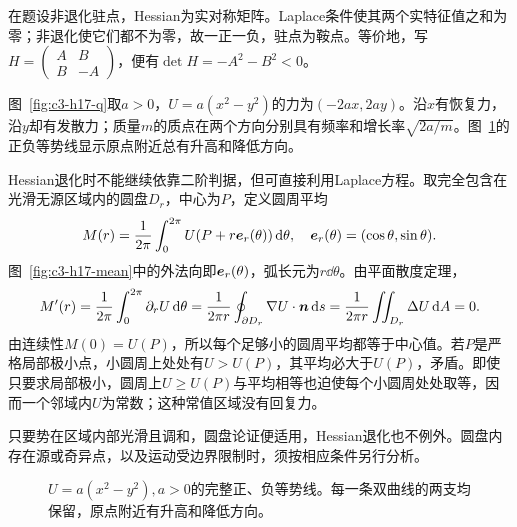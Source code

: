 \begin{solution}
在题设非退化驻点，Hessian为实对称矩阵。Laplace条件使其两个实特征值之和为零；非退化使它们都不为零，故一正一负，驻点为鞍点。等价地，写$H=\begin{pmatrix}A&B\\B&-A\end{pmatrix}$，便有$\det H=-A^2-B^2<0$。

图~\ref{fig:c3-h17-q}取$a>0$，$U=a(x^2-y^2)$的力为$(-2ax,2ay)$。沿$x$有恢复力，沿$y$却有发散力；质量$m$的质点在两个方向分别具有频率和增长率$\sqrt{2a/m}$。图~\ref{fig:c3-h17-s}的正负等势线显示原点附近总有升高和降低方向。

Hessian退化时不能继续依靠二阶判据，但可直接利用Laplace方程。取完全包含在光滑无源区域内的圆盘$D_r$，中心为$P$，定义圆周平均
\[M(r)=\frac1{2\pi}\int_0^{2\pi}U(P+r\bm{e}_r(\theta))\mathop{}\!\mathrm d\theta,
\quad \bm{e}_r(\theta)=(\cos\theta,\sin\theta).\]
图~\ref{fig:c3-h17-mean}中的外法向即$\bm{e}_r(\theta)$，弧长元为$r\dd\theta$。由平面散度定理，
\[M'(r)=\frac1{2\pi}\int_0^{2\pi}\partial_rU\mathop{}\!\mathrm d\theta
=\frac1{2\pi r}\oint_{\partial D_r}\nabla U\cdot\bm{n}\mathop{}\!\mathrm d s
=\frac1{2\pi r}\iint_{D_r}\Delta U\mathop{}\!\mathrm d A=0.\]
由连续性$M(0)=U(P)$，所以每个足够小的圆周平均都等于中心值。若$P$是严格局部极小点，小圆周上处处有$U>U(P)$，其平均必大于$U(P)$，矛盾。即使只要求局部极小，圆周上$U\ge U(P)$与平均相等也迫使每个小圆周处处取等，因而一个邻域内$U$为常数；这种常值区域没有回复力。

只要势在区域内部光滑且调和，圆盘论证便适用，Hessian退化也不例外。圆盘内存在源或奇异点，以及运动受边界限制时，须按相应条件另行分析。

\begin{figure}[H]\centering
{}
\caption{$U=a(x^2-y^2),a>0$的完整正、负等势线。每一条双曲线的两支均保留，原点附近有升高和降低方向。}\label{fig:c3-h17-s}
\end{figure}


\end{solution}
